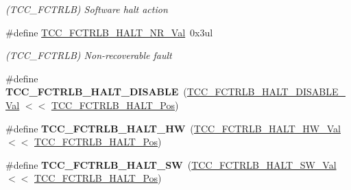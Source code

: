 \begin{DoxyCompactItemize}
\begin{DoxyCompactList}\small\item\em (T\+C\+C\+\_\+\+F\+C\+T\+R\+L\+B) Software halt action \end{DoxyCompactList}\item 
\hypertarget{group___s_a_m_l21___t_c_c_ga5bb4e17a35b13b64016009f9941b64a7}{}\#define \hyperlink{group___s_a_m_l21___t_c_c_ga5bb4e17a35b13b64016009f9941b64a7}{T\+C\+C\+\_\+\+F\+C\+T\+R\+L\+B\+\_\+\+H\+A\+L\+T\+\_\+\+N\+R\+\_\+\+Val}~0x3ul\label{group___s_a_m_l21___t_c_c_ga5bb4e17a35b13b64016009f9941b64a7}

\begin{DoxyCompactList}\small\item\em (T\+C\+C\+\_\+\+F\+C\+T\+R\+L\+B) Non-\/recoverable fault \end{DoxyCompactList}\item 
\hypertarget{group___s_a_m_l21___t_c_c_ga37465fded5556258cd25fe2235bbf5dc}{}\#define {\bfseries T\+C\+C\+\_\+\+F\+C\+T\+R\+L\+B\+\_\+\+H\+A\+L\+T\+\_\+\+D\+I\+S\+A\+B\+L\+E}~(\hyperlink{group___s_a_m_l21___t_c_c_ga70c37ab0f7e3ddff1a9397e9c90b7147}{T\+C\+C\+\_\+\+F\+C\+T\+R\+L\+B\+\_\+\+H\+A\+L\+T\+\_\+\+D\+I\+S\+A\+B\+L\+E\+\_\+\+Val}   $<$$<$ \hyperlink{group___s_a_m_l21___t_c_c_gab9e9865f632211214654163efcbd704d}{T\+C\+C\+\_\+\+F\+C\+T\+R\+L\+B\+\_\+\+H\+A\+L\+T\+\_\+\+Pos})\label{group___s_a_m_l21___t_c_c_ga37465fded5556258cd25fe2235bbf5dc}

\item 
\hypertarget{group___s_a_m_l21___t_c_c_ga544de3bd4c50e9071c7da2ea260c9c7f}{}\#define {\bfseries T\+C\+C\+\_\+\+F\+C\+T\+R\+L\+B\+\_\+\+H\+A\+L\+T\+\_\+\+H\+W}~(\hyperlink{group___s_a_m_l21___t_c_c_ga589d49ba4c5715c9ed800ba9d7e47150}{T\+C\+C\+\_\+\+F\+C\+T\+R\+L\+B\+\_\+\+H\+A\+L\+T\+\_\+\+H\+W\+\_\+\+Val}        $<$$<$ \hyperlink{group___s_a_m_l21___t_c_c_gab9e9865f632211214654163efcbd704d}{T\+C\+C\+\_\+\+F\+C\+T\+R\+L\+B\+\_\+\+H\+A\+L\+T\+\_\+\+Pos})\label{group___s_a_m_l21___t_c_c_ga544de3bd4c50e9071c7da2ea260c9c7f}

\item 
\hypertarget{group___s_a_m_l21___t_c_c_ga868ef30e38561266b068b12069ab3e3b}{}\#define {\bfseries T\+C\+C\+\_\+\+F\+C\+T\+R\+L\+B\+\_\+\+H\+A\+L\+T\+\_\+\+S\+W}~(\hyperlink{group___s_a_m_l21___t_c_c_ga2b92db22efe86b620e2d072545cafb6a}{T\+C\+C\+\_\+\+F\+C\+T\+R\+L\+B\+\_\+\+H\+A\+L\+T\+\_\+\+S\+W\+\_\+\+Val}        $<$$<$ \hyperlink{group___s_a_m_l21___t_c_c_gab9e9865f632211214654163efcbd704d}{T\+C\+C\+\_\+\+F\+C\+T\+R\+L\+B\+\_\+\+H\+A\+L\+T\+\_\+\+Pos})\label{group___s_a_m_l21___t_c_c_ga868ef30e38561266b068b12069ab3e3b}


\end{DoxyCompactItemize}
